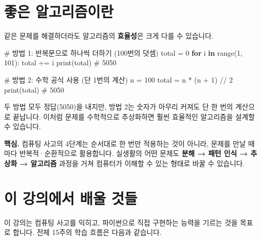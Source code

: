 \documentclass[
  korean,
  11pt,
  a4paper,
  DIV=11,
  numbers=noendperiod]{scrreprt}
\newenvironment{Shaded}{\begin{snugshade}}{\end{snugshade}}
\newcommand{\BuiltInTok}[1]{\textcolor[rgb]{0.00,0.23,0.31}{#1}}
\newcommand{\CommentTok}[1]{\textcolor[rgb]{0.37,0.37,0.37}{#1}}
\newcommand{\ControlFlowTok}[1]{\textcolor[rgb]{0.00,0.23,0.31}{\textbf{#1}}}
\newcommand{\DecValTok}[1]{\textcolor[rgb]{0.68,0.00,0.00}{#1}}
\newcommand{\KeywordTok}[1]{\textcolor[rgb]{0.00,0.23,0.31}{\textbf{#1}}}
\newcommand{\NormalTok}[1]{\textcolor[rgb]{0.00,0.23,0.31}{#1}}
\newcommand{\OperatorTok}[1]{\textcolor[rgb]{0.37,0.37,0.37}{#1}}
\begin{document}
\section{좋은 알고리즘이란}\label{sec-good-algorithm}

같은 문제를 해결하더라도 알고리즘의 \textbf{효율성}은 크게 다를 수
있습니다.

\begin{Shaded}
\begin{Highlighting}[]
\CommentTok{\# 방법 1: 반복문으로 하나씩 더하기 (100번의 덧셈)}
\NormalTok{total }\OperatorTok{=} \DecValTok{0}
\ControlFlowTok{for}\NormalTok{ i }\KeywordTok{in} \BuiltInTok{range}\NormalTok{(}\DecValTok{1}\NormalTok{, }\DecValTok{101}\NormalTok{):}
\NormalTok{    total }\OperatorTok{+=}\NormalTok{ i}
\BuiltInTok{print}\NormalTok{(total)   }\CommentTok{\# 5050}

\CommentTok{\# 방법 2: 수학 공식 사용 (단 1번의 계산)}
\NormalTok{n }\OperatorTok{=} \DecValTok{100}
\NormalTok{total }\OperatorTok{=}\NormalTok{ n }\OperatorTok{*}\NormalTok{ (n }\OperatorTok{+} \DecValTok{1}\NormalTok{) }\OperatorTok{//} \DecValTok{2}
\BuiltInTok{print}\NormalTok{(total)   }\CommentTok{\# 5050}
\end{Highlighting}
\end{Shaded}

두 방법 모두 정답(5050)을 내지만, 방법 2는 숫자가 아무리 커져도 단 한
번의 계산으로 끝납니다. 이처럼 문제를 수학적으로 추상화하면 훨씬
효율적인 알고리즘을 설계할 수 있습니다.

\textbf{핵심.} 컴퓨팅 사고의 4단계는 순서대로 한 번만 적용하는 것이
아니라, 문제를 만날 때마다 반복적·순환적으로 활용합니다. 실생활의 어떤
문제도 \textbf{분해 → 패턴 인식 → 추상화 → 알고리즘} 과정을 거쳐
컴퓨터가 이해할 수 있는 형태로 바꿀 수 있습니다.

\section{이 강의에서 배울 것들}\label{sec-roadmap}

이 강의는 컴퓨팅 사고를 익히고, 파이썬으로 직접 구현하는 능력을 기르는
것을 목표로 합니다. 전체 15주의 학습 흐름은 다음과 같습니다.
\end{document}

